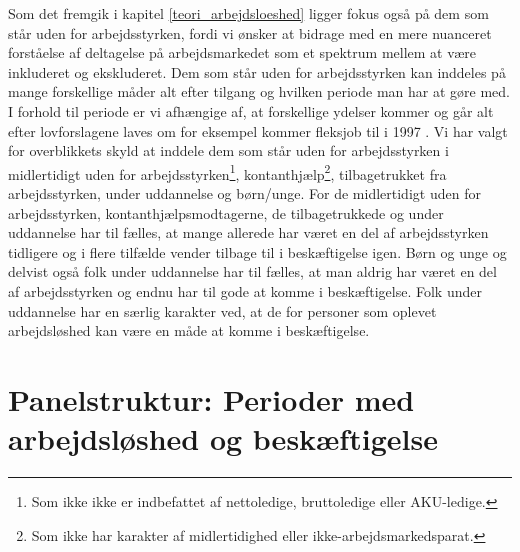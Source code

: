 Som det fremgik i kapitel \ref{teori_arbejdsloeshed} ligger fokus også på dem som står uden for arbejdsstyrken, fordi vi ønsker at bidrage med en mere nuanceret forståelse af deltagelse på arbejdsmarkedet som et spektrum mellem at være inkluderet og ekskluderet. Dem som står uden for arbejdsstyrken kan inddeles på mange forskellige måder alt efter tilgang og hvilken periode man har at gøre med. I forhold til periode er vi afhængige af, at forskellige ydelser kommer og går alt efter lovforslagene laves om for eksempel kommer fleksjob til i 1997 \parencite{lov_fleksjob}. Vi har valgt for overblikkets skyld at inddele dem som står uden for arbejdsstyrken i midlertidigt uden for arbejdsstyrken\footnote{Som ikke ikke er indbefattet af nettoledige, bruttoledige eller AKU-ledige.}, kontanthjælp\footnote{Som ikke har karakter af midlertidighed eller ikke-arbejdsmarkedsparat.}, tilbagetrukket fra arbejdsstyrken, under uddannelse og børn/unge. For de midlertidigt uden for arbejdsstyrken, kontanthjælpsmodtagerne, de tilbagetrukkede og under uddannelse har til fælles, at mange allerede har været en del af arbejdsstyrken tidligere og i flere tilfælde vender tilbage til i beskæftigelse igen. Børn og unge og delvist også folk under uddannelse har til fælles, at man aldrig har været en del af arbejdsstyrken og endnu har til gode at komme i beskæftigelse. Folk under uddannelse har en særlig karakter ved, at de for personer som oplevet arbejdsløshed kan være en måde at komme i beskæftigelse.





\section{Panelstruktur: Perioder med arbejdsløshed og beskæftigelse \label{arbejdsloes_spellsrun}} 

